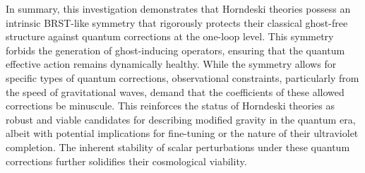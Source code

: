 \documentclass[twocolumn]{aastex631}
\begin{document}
In summary, this investigation demonstrates that Horndeski theories possess an intrinsic BRST-like symmetry that rigorously protects their classical ghost-free structure against quantum corrections at the one-loop level. This symmetry forbids the generation of ghost-inducing operators, ensuring that the quantum effective action remains dynamically healthy. While the symmetry allows for specific types of quantum corrections, observational constraints, particularly from the speed of gravitational waves, demand that the coefficients of these allowed corrections be minuscule. This reinforces the status of Horndeski theories as robust and viable candidates for describing modified gravity in the quantum era, albeit with potential implications for fine-tuning or the nature of their ultraviolet completion. The inherent stability of scalar perturbations under these quantum corrections further solidifies their cosmological viability.
\end{document}
